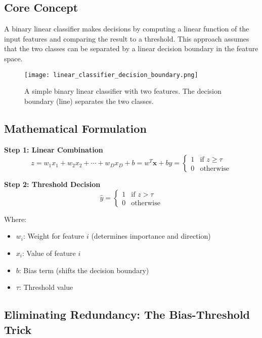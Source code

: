 \subsection{Core Concept}

A binary linear classifier makes decisions by computing a linear function of the input features and comparing the result to a threshold. This approach assumes that the two classes can be separated by a linear decision boundary in the feature space.

\begin{figure}
    \centering
    \texttt{[image: linear\_classifier\_decision\_boundary.png]}
    \caption{A simple binary linear classifier with two features. The decision boundary (line) separates the two classes.}
    \label{fig:linear_classifier}
\end{figure}


\subsection{Mathematical Formulation}

\textbf{Step 1: Linear Combination}
\begin{equation}
z = w_1x_1 + w_2x_2 + \cdots + w_D x_D + b = w^{T}\bm{x} + b
y = \begin{cases}
1 & \text{if } z \geq \tau \\
0 & \text{otherwise}
\end{cases}
\end{equation}


\textbf{Step 2: Threshold Decision}
\begin{equation}
\hat{y} = \begin{cases}
1 & \text{if } z > \tau \\
0 & \text{otherwise}
\end{cases}
\end{equation}

Where:
\begin{itemize}
    \item $w_i$: Weight for feature $i$ (determines importance and direction)
    \item $x_i$: Value of feature $i$
    \item $b$: Bias term (shifts the decision boundary)
    \item $\tau$: Threshold value
\end{itemize}

\subsection{Eliminating Redundancy: The Bias-Threshold Trick}


